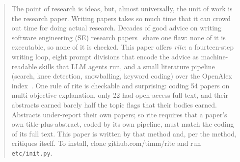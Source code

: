 \begin{abstract}
The point of research is ideas, but, almost universally, the unit of
work is the research paper.
Writing papers takes so much time that it can crowd out time for doing
actual research.
Decades of good advice on writing software engineering (SE) research
papers~\cite{shaw03,widom06,williams11} share one flaw: none of it is
executable, so none of it is checked.
This paper offers \textit{rite}: a fourteen-step writing loop, eight
prompt divisions that encode the advice as machine-readable skills
that LLM agents run, and a small literature pipeline (search, knee
detection, snowballing, keyword coding) over the OpenAlex
index~\cite{priem22}.
One rule of rite is checkable and surprising: coding 54 papers on
multi-objective explanation, only 22 had open-access full text, and
their abstracts earned barely half the topic flags that their bodies
earned.
Abstracts under-report their own papers; so rite requires that a
paper's own title-plus-abstract, coded by its own pipeline, must match
the coding of its full text.
This paper is written by that method and, per the method, critiques
itself.
To install, clone github.com/timm/rite and run \texttt{etc/init.py}.
\end{abstract}
